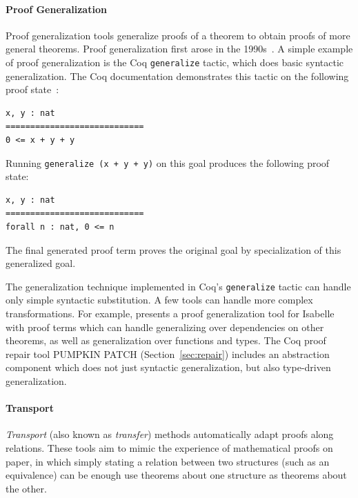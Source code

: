 \paragraph{Proof Generalization} Proof generalization tools generalize proofs of a theorem
to obtain proofs of more general theorems. Proof generalization first arose in
the 1990s~\citep{hasker1992generalization, kolbe1998proof, pons1999conception}.
A simple example of proof generalization
is the Coq \lstinline{generalize} tactic, which does basic syntactic generalization.
The Coq documentation demonstrates this tactic on the following proof state~\citep{coq-tactics}:
\begin{lstlisting}
x, y : nat
============================
0 <= x + y + y
\end{lstlisting}
Running \lstinline{generalize (x + y + y)} on this goal produces the following proof state:
\begin{lstlisting}
x, y : nat
============================
forall n : nat, 0 <= n
\end{lstlisting}
The final generated proof term proves the original goal by specialization of this generalized goal.

The generalization technique implemented in Coq's \lstinline{generalize} tactic can handle only
simple syntactic substitution. A few tools can handle more complex transformations.
For example, \cite{Johnsen2004} presents a proof generalization tool for Isabelle
with proof terms which can handle generalizing over dependencies on other theorems,
as well as generalization over functions and types. %
The Coq proof repair tool \textsc{PUMPKIN PATCH} (Section~\ref{sec:repair}) includes an abstraction component
which does not just syntactic generalization, but also type-driven generalization.

\paragraph{Transport}
\textit{Transport} (also known as \textit{transfer}) methods
automatically adapt proofs along relations.
These tools aim to mimic the experience of mathematical proofs on paper, in which simply stating a relation
between two structures (such as an equivalence) can be
enough use theorems about one structure as theorems about the other.

